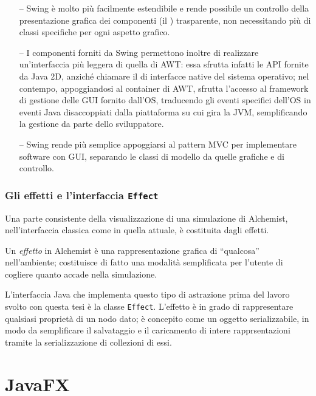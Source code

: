             \begin{itemize}
              \item[--] Swing è molto più facilmente estendibile e rende possibile un controllo della presentazione grafica dei componenti (il ) trasparente, non necessitando più di classi specifiche per ogni aspetto grafico.
              \item[--] I componenti forniti da Swing permettono inoltre di realizzare un'interfaccia più leggera di quella di AWT: essa sfrutta infatti le API fornite da Java 2D, anziché chiamare il  di interfacce native del sistema operativo; nel contempo, appoggiandosi al container di AWT, sfrutta l'accesso al framework di gestione delle GUI fornito dall'OS, traducendo gli eventi specifici dell'OS in eventi Java disaccoppiati dalla piattaforma su cui gira la JVM, semplificando la gestione da parte dello sviluppatore.
              \item[--] Swing rende più semplice appoggiarsi al pattern MVC per implementare software con GUI, separando le classi di modello da quelle grafiche e di controllo.
            \end{itemize}

            \subsubsection{Gli effetti e l'interfaccia \texttt{Effect}}\label{subsub:effect}

            Una parte consistente della visualizzazione di una simulazione di Alchemist, nell'interfaccia classica come in quella attuale, è costituita dagli effetti.

            Un \emph{effetto} in Alchemist è una rappresentazione grafica di ``qualcosa'' nell'ambiente; costituisce di fatto una modalità semplificata per l'utente di cogliere quanto accade nella simulazione.

            L'interfaccia Java che implementa questo tipo di astrazione prima del lavoro svolto con questa tesi è la classe \texttt{Effect}.
            L'effetto è in grado di rappresentare qualsiasi proprietà di un nodo dato; è concepito come un oggetto serializzabile, in modo da semplificare il salvataggio e il caricamento di intere rapprsentazioni tramite la serializzazione di collezioni di essi.

    \section{JavaFX}\label{sec:jfx}
